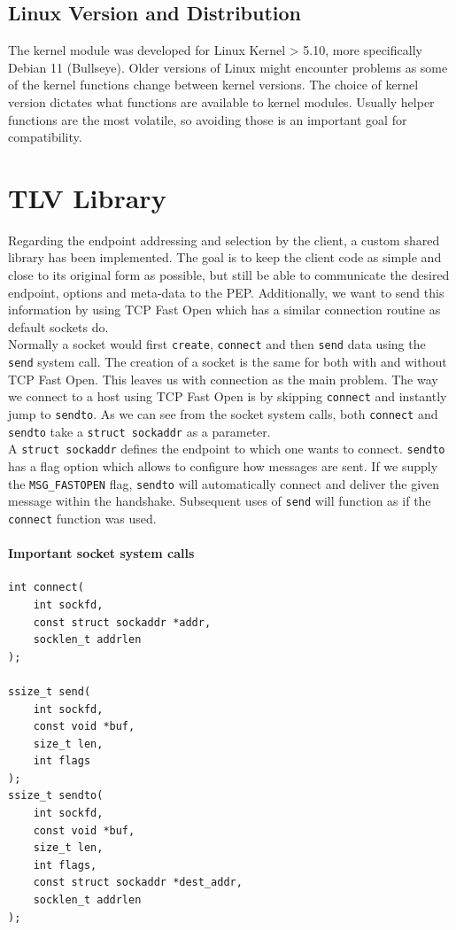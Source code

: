 \documentclass[a4paper,english, 11pt]{report}
\begin{document}
\subsection{Linux Version and Distribution}
The kernel module was developed for Linux Kernel > 5.10, more specifically Debian 11 (Bullseye). Older versions of Linux might encounter problems as some of the kernel functions change between kernel versions. The choice of kernel version dictates what functions are available to kernel modules. Usually helper functions are the most volatile, so avoiding those is an important goal for compatibility.

\section{TLV Library}
Regarding the endpoint addressing and selection by the client, a custom shared library has been implemented. The goal is to keep the client code as simple and close to its original form as possible, but still be able to communicate the desired endpoint, options and meta-data to the PEP. Additionally, we want to send this information by using TCP Fast Open which has a similar connection routine as default sockets do.\\

Normally a socket would first \verb|create|, \verb|connect| and then \verb|send| data using the \verb|send| system call. The creation of a socket is the same for both with and without TCP Fast Open. This leaves us with connection as the main problem. The way we connect to a host using TCP Fast Open is by skipping \verb|connect| and instantly jump to \verb|sendto|. As we can see from the socket system calls, both \verb|connect| and \verb|sendto| take a \verb|struct sockaddr| as a parameter.\\

A \verb|struct sockaddr| defines the endpoint to which one wants to connect. \verb|sendto| has a flag option which allows to configure how messages are sent. If we supply the \verb|MSG_FASTOPEN| flag, \verb|sendto| will automatically connect and deliver the given message within the handshake. Subsequent uses of \verb|send| will function as if the \verb|connect| function was used.\\

\noindent\begin{minipage}{\linewidth}
\paragraph{Important socket system calls}
\begin{verbatim}
int connect(
    int sockfd,
    const struct sockaddr *addr,
    socklen_t addrlen
);

ssize_t send(
    int sockfd,
    const void *buf,
    size_t len,
    int flags
);
ssize_t sendto(
    int sockfd,
    const void *buf,
    size_t len,
    int flags,
    const struct sockaddr *dest_addr,
    socklen_t addrlen
);
\end{verbatim}
\end{minipage}\\
\end{document}
